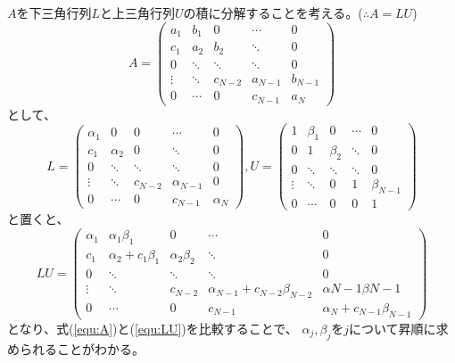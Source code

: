 \documentclass[a4j, titlepage]{jsarticle}
\numberwithin{equation}{section}
\begin{document}
        $A$を下三角行列$L$と上三角行列$U$の積に分解することを考える。($\therefore A = LU$)
        \begin{equation}
            A = \begin{pmatrix}
                a_1 & b_1 & 0 & \cdots & 0 \\
                c_1 & a_2 & b_2 & \ddots & 0 \\
                0 & \ddots & \ddots & \ddots & 0 \\
                \vdots & \ddots & c_{N - 2} & a_{N - 1} & b_{N - 1} \\
                0 & \cdots & 0 & c_{N - 1} & a_N
            \end{pmatrix} \label{equ:A}
        \end{equation}
        として、
        \begin{equation*}
            L = \begin{pmatrix}
                \alpha_1 & 0 & 0 & \cdots & 0 \\
                c_1 & \alpha_2 & 0 & \ddots & 0 \\
                0 & \ddots & \ddots & \ddots & 0 \\
                \vdots & \ddots & c_{N - 2} & \alpha_{N - 1} & 0 \\
                0 & \cdots & 0 & c_{N - 1} & \alpha_N
            \end{pmatrix}, U = \begin{pmatrix}
                1 & \beta_1 & 0 & \cdots & 0 \\
                0 & 1 & \beta_2 & \ddots & 0 \\
                0 & \ddots & \ddots & \ddots & 0 \\
                \vdots & \ddots & 0 & 1 & \beta_{N - 1} \\
                0 & \cdots & 0 & 0 & 1
            \end{pmatrix}
        \end{equation*}
        と置くと、
        \begin{equation}
            LU = \begin{pmatrix}
                \alpha_1 & \alpha_1\beta_1 & 0 & \cdots & 0 \\
                c_1 & \alpha_2 + c_1\beta_1 & \alpha_2\beta_2 & \ddots & 0 \\
                0 & \ddots & \ddots & \ddots & 0 \\
                \vdots & \ddots & c_{N - 2} & \alpha_{N - 1} + c_{N - 2}\beta_{N - 2} & \alpha{N - 1}\beta{N - 1} \\
                0 & \cdots & 0 & c_{N - 1} & \alpha_N + c_{N - 1}\beta_{N - 1}
            \end{pmatrix} \label{equ:LU}
        \end{equation}
        となり、式(\ref{equ:A})と(\ref{equ:LU})を比較することで、
        $\alpha_j, \beta_j$を$j$について昇順に求められることがわかる。
\end{document}
